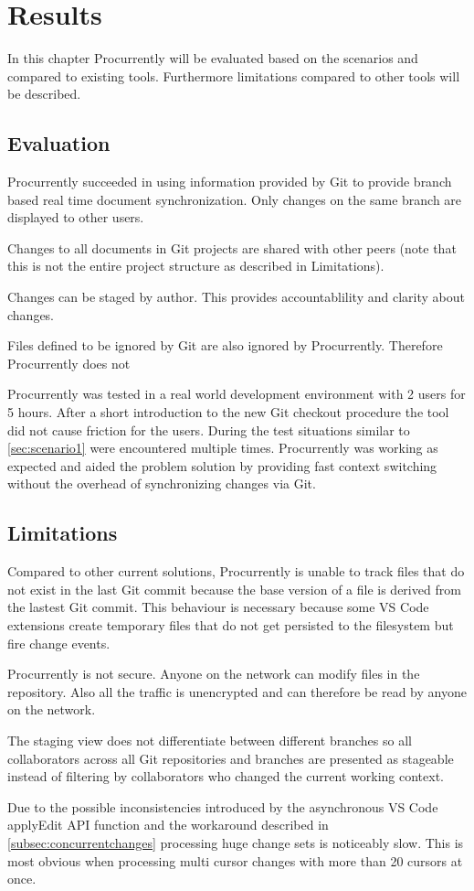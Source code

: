 \chapter{Results}
\label{sec:results}

In this chapter Procurrently will be evaluated based on the scenarios and compared to existing tools.
Furthermore limitations compared to other tools will be described.

\section{Evaluation}
Procurrently succeeded in using information provided by Git to provide branch based real time document synchronization. Only changes on the same branch are displayed to other users.

Changes to all documents in Git projects are shared with other peers (note that this is not the entire project structure as described in Limitations).

Changes can be staged by author. This provides accountablility and clarity about changes.

Files defined to be ignored by Git are also ignored by Procurrently.
Therefore Procurrently does not 

Procurrently was tested in a real world development environment with 2 users for 5 hours. After a short introduction to the new Git checkout procedure the tool did not cause friction for the users. During the test situations similar to \ref{sec:scenario1} were encountered multiple times. Procurrently was working as expected and aided the problem solution by providing fast context switching without the overhead of synchronizing changes via Git.

\section{Limitations}

Compared to other current solutions, Procurrently is unable to track files that do not exist in the last Git commit because the base version of a file is derived from the lastest Git commit. This behaviour is necessary because some VS Code extensions create temporary files that do not get persisted to the filesystem but fire change events.

Procurrently is not secure. Anyone on the network can modify files in the repository. Also all the traffic is unencrypted and can therefore be read by anyone on the network.

The staging view does not differentiate between different branches so all collaborators across all Git repositories and branches are presented as stageable instead of filtering by collaborators who changed the current working context.

Due to the possible inconsistencies introduced by the asynchronous VS Code applyEdit API function and the workaround described in \ref{subsec:concurrentchanges} processing huge change sets is noticeably slow. This is most obvious when processing multi cursor changes with more than 20 cursors at once.